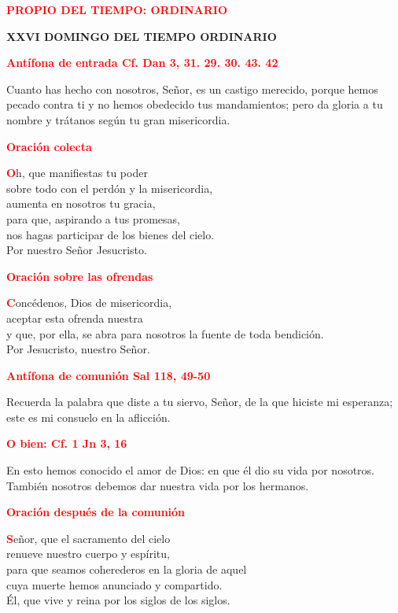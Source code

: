 \documentclass[12pt, letterpaper]{report}
\begin{document}
\begin{center}
\Large {\bfseries \textcolor{red}{PROPIO DEL TIEMPO: ORDINARIO}}
\end{center}

\begin{center}
\Huge {\bfseries XXVI DOMINGO DEL TIEMPO ORDINARIO}
\end{center}

\Large {\bfseries \textcolor{red}{Ant\'ifona de entrada \hspace{1cm} Cf. Dan 3, 31. 29. 30. 43. 42} }

\Large {Cuanto has hecho con nosotros, Se\~nor, es un castigo merecido, porque hemos pecado contra ti y no hemos obedecido tus mandamientos; pero da gloria a tu nombre y tr\'atanos seg\'un tu gran misericordia.}

\Large {\bfseries \textcolor{red}{Oraci\'on colecta}}

\lettrine[lines=1]{\bfseries \textcolor{red}{O}}{}\Large {h, que manifiestas tu poder \\
sobre todo con el perd\'on y la misericordia, \\
aumenta en nosotros tu gracia, \\
para que, aspirando a tus promesas, \\
nos hagas participar de los bienes del cielo. \\
Por nuestro Se\~nor Jesucristo.}

\Large {\bfseries \textcolor{red}{Oraci\'on sobre las ofrendas}}

\lettrine[lines=1]{\bfseries \textcolor{red}{C}}{}\Large onc\'edenos, Dios de misericordia, \\
aceptar esta ofrenda nuestra \\
y que, por ella, se abra para nosotros la fuente de toda bendici\'on. \\
Por Jesucristo, nuestro Se\~nor.

\newpage

\Large {\bfseries \textcolor{red}{Ant\'ifona de comuni\'on \hspace{1cm} Sal 118, 49-50}}

\Large Recuerda la palabra que diste a tu siervo, Se\~nor, de la que hiciste mi esperanza; este es mi consuelo en la aflicci\'on.

\Large {\bfseries \textcolor{red}{O bien: \hspace{1cm} Cf. 1 Jn 3, 16 }}

\Large En esto hemos conocido el amor de Dios: en que \'el dio su vida por nosotros. Tambi\'en nosotros debemos dar nuestra vida por los hermanos.

\Large {\bfseries \textcolor{red}{Oraci\'on despu\'es de la comuni\'on}}

\lettrine[lines=1]{\bfseries \textcolor{red}{S}}{}\Large e\~nor, que el sacramento del cielo \\
renueve nuestro cuerpo y esp\'iritu, \\
para que seamos coherederos en la gloria de aquel \\
cuya muerte hemos anunciado y compartido. \\
\'El, que vive y reina por los siglos de los siglos.
\end{document}

